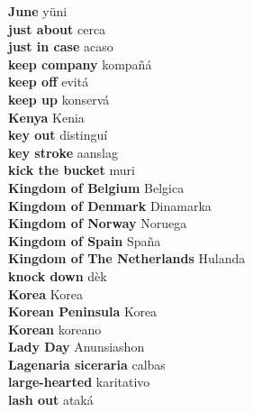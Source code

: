 \textbf{ June  } yüni \\
\textbf{ just about  } cerca \\
\textbf{ just in case  } acaso \\
\textbf{ keep company  } kompañá \\
\textbf{ keep off  } evitá \\
\textbf{ keep up  } konservá \\
\textbf{ Kenya  } Kenia \\
\textbf{ key out  } distinguí \\
\textbf{ key stroke  } aanslag \\
\textbf{ kick the bucket  } muri \\
\textbf{ Kingdom of Belgium  } Belgica \\
\textbf{ Kingdom of Denmark  } Dinamarka \\
\textbf{ Kingdom of Norway  } Noruega \\
\textbf{ Kingdom of Spain  } Spaña \\
\textbf{ Kingdom of The Netherlands  } Hulanda \\
\textbf{ knock down  } dèk \\
\textbf{ Korea  } Korea \\
\textbf{ Korean Peninsula  } Korea \\
\textbf{ Korean  } koreano \\
\textbf{ Lady Day  } Anunsiashon \\
\textbf{ Lagenaria siceraria  } calbas \\
\textbf{ large-hearted  } karitativo \\
\textbf{ lash out  } ataká \\
